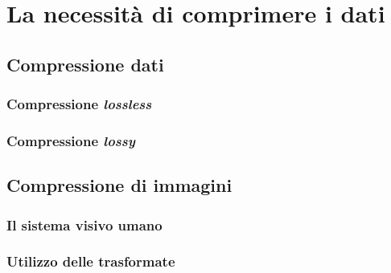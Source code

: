 
\chapter{La necessità di comprimere i dati} %

\label{Chapter3}



\section{Compressione dati}

\subsection{Compressione \emph{lossless}}


\subsection{Compressione \emph{lossy}}


\section{Compressione di immagini}


\subsection{Il sistema visivo umano}


\subsection{Utilizzo delle trasformate}

